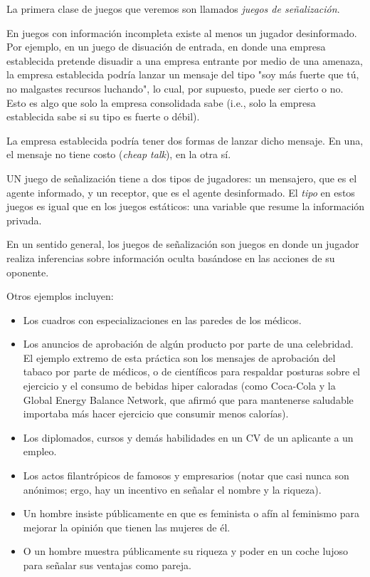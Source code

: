 \documentclass[12pt]{article}
\begin{document}
La primera clase de juegos que veremos son llamados \textit{juegos de señalización}.

En juegos con información incompleta existe al menos un jugador desinformado. Por ejemplo, en un juego de disuación de entrada, en donde una empresa establecida pretende disuadir a una empresa entrante por medio de una amenaza, la empresa establecida podría lanzar un mensaje del tipo "soy más fuerte que tú, no malgastes recursos luchando", lo cual, por supuesto, puede ser cierto o no. Esto es algo que solo la empresa consolidada sabe (i.e., solo la empresa establecida sabe si su tipo es fuerte o débil).

La empresa establecida podría tener dos formas de lanzar dicho mensaje. En una, el mensaje no tiene costo (\textit{cheap talk}), en la otra sí.

UN juego de señalización tiene a dos tipos de jugadores: un mensajero, que es el agente informado, y un receptor, que es el agente desinformado. El \textit{tipo} en estos juegos es igual que en los juegos estáticos: una variable que resume la información privada.

En un sentido general, los juegos de señalización son juegos en donde un jugador realiza inferencias sobre información oculta basándose en las acciones de su oponente.

Otros ejemplos incluyen:

\begin{itemize}
	\setlength{\itemsep}{0pt}
	\setlength{\parskip}{0pt}
	\setlength{\parsep}{0pt}
	\item Los cuadros con especializaciones en las paredes de los médicos.
	\item Los anuncios de aprobación de algún producto por parte de una celebridad. El ejemplo extremo de esta práctica son los mensajes de aprobación del tabaco por parte de médicos, o de científicos para respaldar posturas sobre el ejercicio y el consumo de bebidas hiper caloradas (como Coca-Cola y la Global Energy Balance Network, que afirmó que para mantenerse saludable importaba más hacer ejercicio que consumir menos calorías).
	\item Los diplomados, cursos y demás habilidades en un CV de un aplicante a un empleo.
	\item Los actos filantrópicos de famosos y empresarios (notar que casi nunca son anónimos; ergo, hay un incentivo en señalar el nombre y la riqueza).
	\item Un hombre insiste públicamente en que es feminista o afín al feminismo para mejorar la opinión que tienen las mujeres de él.
	\item O un hombre muestra públicamente su riqueza y poder en un coche lujoso para señalar sus ventajas como pareja.
\end{itemize}
\end{document}
